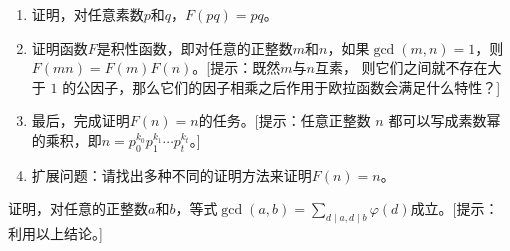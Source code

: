 \begin{problemset}
\begin{enumerate}
  \item 证明，对任意素数$p$和$q$，$F(pq) = pq$。

  \item 证明函数$F$是积性函数，即对任意的正整数$m$和$n$，如果$\gcd(m,n) = 1$，则$F(mn) = F(m)F(n)$。[提示：既然$m$与$n$互素，
  则它们之间就不存在大于 $1$ 的公因子，那么它们的因子相乘之后作用于欧拉函数会满足什么特性？]

  \item 最后，完成证明$F(n) = n$的任务。[提示：任意正整数 $n$ 都可以写成素数幂的乘积，即$n = p_0^{k_0} p_1^{k_1} \cdots p_t^{k_t}$。]

  \item 扩展问题：请找出多种不同的证明方法来证明$F(n) = n$。
  \end{enumerate}

  \item 证明，对任意的正整数$a$和$b$，等式$\gcd(a,b) = \sum_{d \mid a, d \mid b}\varphi(d)$成立。[提示：利用以上结论。]

\end{problemset}
